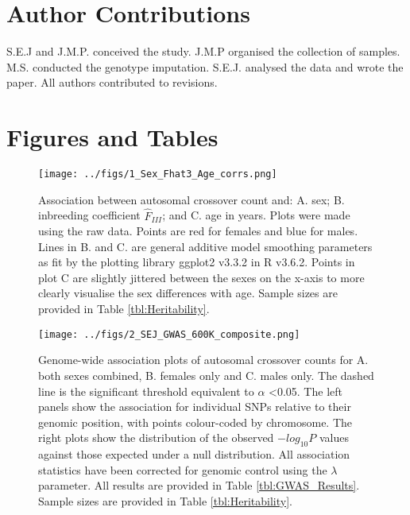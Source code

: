 \documentclass[a4paper,11pt]{article}
\begin{document}
\section*{Author Contributions}

S.E.J and J.M.P. conceived the study. J.M.P organised the collection of samples. M.S. conducted the genotype imputation. S.E.J. analysed the data and wrote the paper. All authors contributed to revisions.

\pagebreak


\section*{Figures and Tables}

\begin{figure}[H]
	\centering 
	\texttt{[image: ../figs/1\_Sex\_Fhat3\_Age\_corrs.png]}
	\captionsetup{width=.9\textwidth}
	\caption{Association between autosomal crossover count and: A. sex; B. inbreeding coefficient $\hat{F}_{III}$; and C. age in years. Plots were made using the raw data. Points are red for females and blue for males. Lines in B. and C. are general additive model smoothing parameters as fit by the plotting library ggplot2 v3.3.2 \citep{Wickham2016} in R v3.6.2. Points in plot C are slightly jittered between the sexes on the x-axis to more clearly visualise the sex differences with age. Sample sizes are provided in Table \ref{tbl:Heritability}.}
	\label{fig:Sex_F_Age}
\end{figure} 

\pagebreak

\begin{figure}[H]
	\centering 
	\texttt{[image: ../figs/2\_SEJ\_GWAS\_600K\_composite.png]}
	\captionsetup{width=1\textwidth}
	\caption{Genome-wide association plots of autosomal crossover counts for A. both sexes combined, B. females only and C. males only. The dashed line is the significant threshold equivalent to $\alpha$ \textless 0.05. The left panels show the association for individual SNPs relative to their genomic position, with points colour-coded by chromosome. The right plots show the distribution of the observed $-log_{10}P$ values against those expected under a null distribution. All association statistics have been corrected for genomic control using the $\lambda$ parameter. All results are provided in Table \ref{tbl:GWAS_Results}. Sample sizes are provided in Table \ref{tbl:Heritability}.}
	\label{fig:GWAS_600K}
\end{figure}
\end{document}
